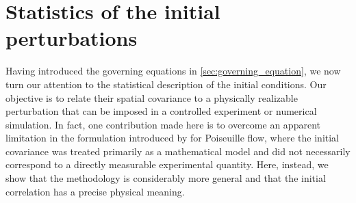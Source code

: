 \section{Statistics of the initial perturbations}
\label{sec:statistics_of_the_initial_perturbations}

Having introduced the governing equations in \cref{sec:governing_equation}, we now turn our attention to the statistical description of the initial conditions. Our objective is to relate their spatial covariance to a physically realizable perturbation that can be imposed in a controlled experiment or numerical simulation. In fact, one contribution made here is to overcome an apparent limitation in the formulation introduced by \citet{frame-towne-2024} for Poiseuille flow, where the initial covariance was treated primarily as a mathematical model and did not necessarily correspond to a directly measurable experimental quantity. Here, instead, we show that the methodology is considerably more general and that the initial correlation has a precise physical meaning.

